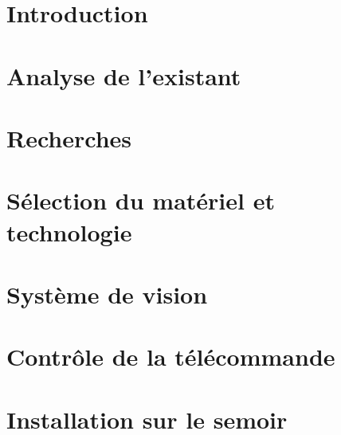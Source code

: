 \documentclass[
    iai, %
    eai, %
]{heig-tb}
\begin{document}
\maketitle
\frontmatter
\clearemptydoublepage

\preamble
\authentification

\begin{abstract}
    
\end{abstract}

\clearemptydoublepage
{
    \tableofcontents
    \let\cleardoublepage\clearpage
    \listoffigures
    \let\cleardoublepage\clearpage
    \listoftables
    \let\cleardoublepage\clearpage
    \listoflistings
}

\printnomenclature
\clearemptydoublepage
{}

\mainmatter
\chapter{Introduction}

%

\chapter{Analyse de l'existant}
\label{chap:exi}


\chapter{Recherches}


\chapter{Sélection du matériel et technologie}


\chapter{Système de vision}


\chapter{Contrôle de la télécommande}


\chapter{Installation sur le semoir}

\end{document}
